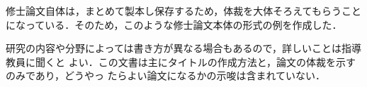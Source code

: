 修士論文自体は，まとめて製本し保存するため，体裁を大体そろえてもらうこと
になっている．そのため，このような修士論文本体の形式の例を作成した．

研究の内容や分野によっては書き方が異なる場合もあるので，詳しいことは指導教員に聞くと
よい．この文書は主にタイトルの作成方法と，論文の体裁を示すのみであり，どうやっ
たらよい論文になるかの示唆は含まれていない．